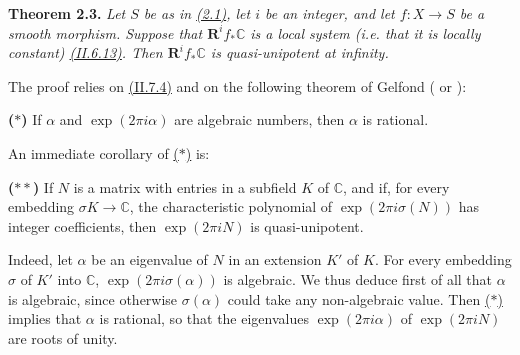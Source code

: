\documentclass{report}
\newenvironment{itenv}[1]
  {\phantomsection\par\medskip\noindent\textbf{#1.}\itshape}
  {\par\medskip}
\newenvironment{itenv*}
  {\phantomsection\par\medskip\noindent\itshape}
  {\par\medskip}
\newcommand{\CC}{\mathbb{C}}
\newcommand{\RR}{\mathbf{R}}
\begin{document}
\begin{itenv}{Theorem 2.3}
\label{III.2.3}
  Let $S$ be as in \hyperref[III.2.1]{(2.1)}, let $i$ be an integer, and let $f\colon X\to S$ be a smooth morphism.
  Suppose that $\RR^if_*\CC$ is a local system (i.e. that it is locally constant) \hyperref[II.6.13]{(II.6.13)}.
  Then $\RR^if_*\CC$ is quasi-unipotent at infinity.
\end{itenv}

The proof relies on \hyperref[II.7.4]{(II.7.4)} and on the following theorem of Gelfond (\cite{6} or \cite{2}):

\begin{itenv*}
\label{III.2.3.*}
  {\rm\textbf{($*$)}}
  If $\alpha$ and $\exp(2\pi i\alpha)$ are algebraic numbers, then $\alpha$ is rational.
\end{itenv*}

An immediate corollary of \hyperref[III.2.3.*]{($*$)} is:

\begin{itenv*}
\label{III.2.3.**}
  {\rm\textbf{($**$)}}
  If $N$ is a matrix with entries in a subfield $K$ of $\CC$, and if, for every embedding $\sigma K\to\CC$, the characteristic polynomial of $\exp(2\pi i\sigma(N))$ has integer coefficients, then $\exp(2\pi iN)$ is quasi-unipotent.
\end{itenv*}

Indeed, let $\alpha$ be an eigenvalue of $N$ in an extension $K'$ of $K$.
For every embedding $\sigma$ of $K'$ into $\CC$, $\exp(2\pi i\sigma(\alpha))$ is algebraic.
We thus deduce first of all that $\alpha$ is algebraic, since otherwise $\sigma(\alpha)$ could take any non-algebraic value.
Then \hyperref[III.2.3.*]{($*$)} implies that $\alpha$ is rational, so that the eigenvalues $\exp(2\pi i\alpha)$ of $\exp(2\pi iN)$ are roots of unity.
\end{document}
